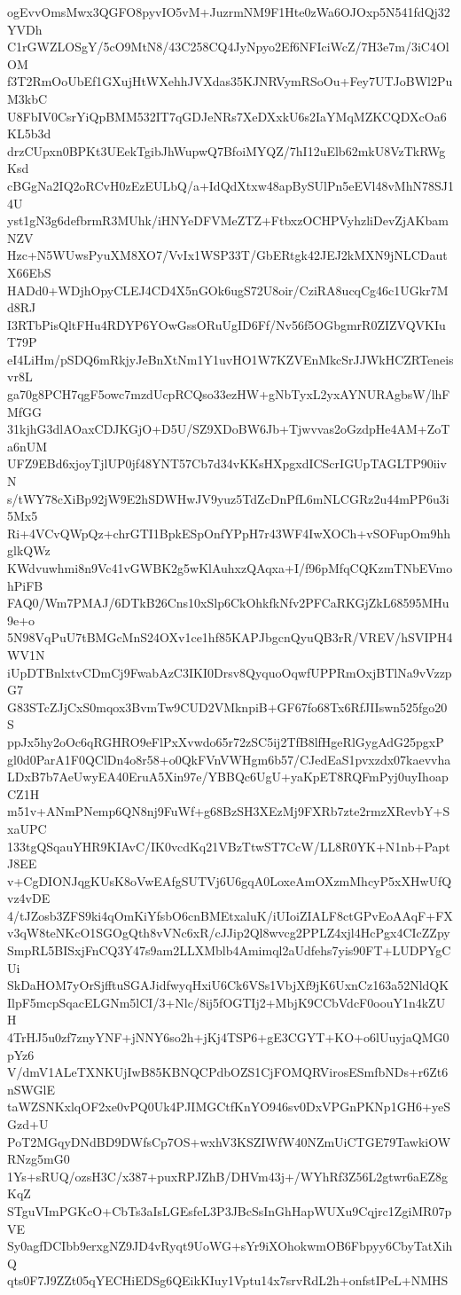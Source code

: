 ogEvvOmsMwx3QGFO8pyvIO5vM+JuzrmNM9F1Hte0zWa6OJOxp5N541fdQj32YVDh
C1rGWZLOSgY/5cO9MtN8/43C258CQ4JyNpyo2Ef6NFIciWcZ/7H3e7m/3iC4OlOM
f3T2RmOoUbEf1GXujHtWXehhJVXdas35KJNRVymRSoOu+Fey7UTJoBWl2PuM3kbC
U8FbIV0CsrYiQpBMM532IT7qGDJeNRs7XeDXxkU6s2IaYMqMZKCQDXcOa6KL5b3d
drzCUpxn0BPKt3UEekTgibJhWupwQ7BfoiMYQZ/7hI12uElb62mkU8VzTkRWgKsd
cBGgNa2IQ2oRCvH0zEzEULbQ/a+IdQdXtxw48apBySUlPn5eEVl48vMhN78SJ14U
yst1gN3g6defbrmR3MUhk/iHNYeDFVMeZTZ+FtbxzOCHPVyhzliDevZjAKbamNZV
Hzc+N5WUwsPyuXM8XO7/VvIx1WSP33T/GbERtgk42JEJ2kMXN9jNLCDautX66EbS
HADd0+WDjhOpyCLEJ4CD4X5nGOk6ugS72U8oir/CziRA8ucqCg46c1UGkr7Md8RJ
I3RTbPisQltFHu4RDYP6YOwGssORuUgID6Ff/Nv56f5OGbgmrR0ZIZVQVKIuT79P
eI4LiHm/pSDQ6mRkjyJeBnXtNm1Y1uvHO1W7KZVEnMkcSrJJWkHCZRTeneisvr8L
ga70g8PCH7qgF5owc7mzdUcpRCQso33ezHW+gNbTyxL2yxAYNURAgbsW/lhFMfGG
31kjhG3dlAOaxCDJKGjO+D5U/SZ9XDoBW6Jb+Tjwvvas2oGzdpHe4AM+ZoTa6nUM
UFZ9EBd6xjoyTjlUP0jf48YNT57Cb7d34vKKsHXpgxdICScrIGUpTAGLTP90iivN
s/tWY78cXiBp92jW9E2hSDWHwJV9yuz5TdZcDnPfL6mNLCGRz2u44mPP6u3i5Mx5
Ri+4VCvQWpQz+chrGTI1BpkESpOnfYPpH7r43WF4IwXOCh+vSOFupOm9hhglkQWz
KWdvuwhmi8n9Vc41vGWBK2g5wKlAuhxzQAqxa+I/f96pMfqCQKzmTNbEVmohPiFB
FAQ0/Wm7PMAJ/6DTkB26Cns10xSlp6CkOhkfkNfv2PFCaRKGjZkL68595MHu9e+o
5N98VqPuU7tBMGcMnS24OXv1ce1hf85KAPJbgcnQyuQB3rR/VREV/hSVIPH4WV1N
iUpDTBnlxtvCDmCj9FwabAzC3IKI0Drsv8QyquoOqwfUPPRmOxjBTlNa9vVzzpG7
G83STcZJjCxS0mqox3BvmTw9CUD2VMknpiB+GF67fo68Tx6RfJIIswn525fgo20S
ppJx5hy2oOc6qRGHRO9eFlPxXvwdo65r72zSC5ij2TfB8lfHgeRlGygAdG25pgxP
gl0d0ParA1F0QClDn4o8r58+o0QkFVnVWHgm6b57/CJedEaS1pvxzdx07kaevvha
LDxB7b7AeUwyEA40EruA5Xin97e/YBBQc6UgU+yaKpET8RQFmPyj0uyIhoapCZ1H
m51v+ANmPNemp6QN8nj9FuWf+g68BzSH3XEzMj9FXRb7zte2rmzXRevbY+SxaUPC
133tgQSqauYHR9KIAvC/IK0vcdKq21VBzTtwST7CcW/LL8R0YK+N1nb+PaptJ8EE
v+CgDIONJqgKUsK8oVwEAfgSUTVj6U6gqA0LoxeAmOXzmMhcyP5xXHwUfQvz4vDE
4/tJZosb3ZFS9ki4qOmKiYfsbO6cnBMEtxaluK/iUIoiZIALF8ctGPvEoAAqF+FX
v3qW8teNKcO1SGOgQth8vVNc6xR/cJJip2Ql8wvcg2PPLZ4xjl4HcPgx4CIcZZpy
SmpRL5BISxjFnCQ3Y47s9am2LLXMblb4Amimql2aUdfehs7yis90FT+LUDPYgCUi
SkDaHOM7yOrSjfftuSGAJidfwyqHxiU6Ck6VSs1VbjXf9jK6UxnCz163a52NldQK
IlpF5mcpSqacELGNm5lCI/3+Nlc/8ij5fOGTIj2+MbjK9CCbVdcF0oouY1n4kZUH
4TrHJ5u0zf7znyYNF+jNNY6so2h+jKj4TSP6+gE3CGYT+KO+o6lUuyjaQMG0pYz6
V/dmV1ALeTXNKUjIwB85KBNQCPdbOZS1CjFOMQRVirosESmfbNDs+r6Zt6nSWGlE
taWZSNKxlqOF2xe0vPQ0Uk4PJIMGCtfKnYO946sv0DxVPGnPKNp1GH6+yeSGzd+U
PoT2MGqyDNdBD9DWfsCp7OS+wxhV3KSZIWfW40NZmUiCTGE79TawkiOWRNzg5mG0
1Ys+sRUQ/ozsH3C/x387+puxRPJZhB/DHVm43j+/WYhRf3Z56L2gtwr6aEZ8gKqZ
STguVImPGKcO+CbTs3aIsLGEsfeL3P3JBcSsInGhHapWUXu9Cqjrc1ZgiMR07pVE
Sy0agfDCIbb9erxgNZ9JD4vRyqt9UoWG+sYr9iXOhokwmOB6Fbpyy6CbyTatXihQ
qts0F7J9ZZt05qYECHiEDSg6QEikKIuy1Vptu14x7srvRdL2h+onfstIPeL+NMHS
